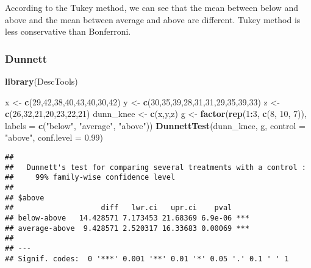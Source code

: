 \documentclass[]{article}
\newenvironment{Shaded}{\begin{snugshade}}{\end{snugshade}}
\newcommand{\KeywordTok}[1]{\textcolor[rgb]{0.13,0.29,0.53}{\textbf{#1}}}
\newcommand{\DataTypeTok}[1]{\textcolor[rgb]{0.13,0.29,0.53}{#1}}
\newcommand{\DecValTok}[1]{\textcolor[rgb]{0.00,0.00,0.81}{#1}}
\newcommand{\FloatTok}[1]{\textcolor[rgb]{0.00,0.00,0.81}{#1}}
\newcommand{\StringTok}[1]{\textcolor[rgb]{0.31,0.60,0.02}{#1}}
\newcommand{\OperatorTok}[1]{\textcolor[rgb]{0.81,0.36,0.00}{\textbf{#1}}}
\newcommand{\NormalTok}[1]{#1}
\begin{document}
According to the Tukey method, we can see that the mean between below
and above and the mean between average and above are different. Tukey
method is less conservative than Bonferroni.

\subsubsection{Dunnett}\label{dunnett}

\begin{Shaded}
\begin{Highlighting}[]
\KeywordTok{library}\NormalTok{(DescTools)}
\end{Highlighting}
\end{Shaded}

\begin{Shaded}
\begin{Highlighting}[]
\NormalTok{x <-}\StringTok{ }\KeywordTok{c}\NormalTok{(}\DecValTok{29}\NormalTok{,}\DecValTok{42}\NormalTok{,}\DecValTok{38}\NormalTok{,}\DecValTok{40}\NormalTok{,}\DecValTok{43}\NormalTok{,}\DecValTok{40}\NormalTok{,}\DecValTok{30}\NormalTok{,}\DecValTok{42}\NormalTok{)}
\NormalTok{y <-}\StringTok{ }\KeywordTok{c}\NormalTok{(}\DecValTok{30}\NormalTok{,}\DecValTok{35}\NormalTok{,}\DecValTok{39}\NormalTok{,}\DecValTok{28}\NormalTok{,}\DecValTok{31}\NormalTok{,}\DecValTok{31}\NormalTok{,}\DecValTok{29}\NormalTok{,}\DecValTok{35}\NormalTok{,}\DecValTok{39}\NormalTok{,}\DecValTok{33}\NormalTok{)}
\NormalTok{z <-}\StringTok{ }\KeywordTok{c}\NormalTok{(}\DecValTok{26}\NormalTok{,}\DecValTok{32}\NormalTok{,}\DecValTok{21}\NormalTok{,}\DecValTok{20}\NormalTok{,}\DecValTok{23}\NormalTok{,}\DecValTok{22}\NormalTok{,}\DecValTok{21}\NormalTok{)}
\NormalTok{dunn_knee <-}\StringTok{ }\KeywordTok{c}\NormalTok{(x,y,z)}
\NormalTok{g <-}\StringTok{ }\KeywordTok{factor}\NormalTok{(}\KeywordTok{rep}\NormalTok{(}\DecValTok{1}\OperatorTok{:}\DecValTok{3}\NormalTok{, }\KeywordTok{c}\NormalTok{(}\DecValTok{8}\NormalTok{, }\DecValTok{10}\NormalTok{, }\DecValTok{7}\NormalTok{)),}
            \DataTypeTok{labels =} \KeywordTok{c}\NormalTok{(}\StringTok{"below"}\NormalTok{,}
                       \StringTok{"average"}\NormalTok{,}
                       \StringTok{"above"}\NormalTok{))}
\KeywordTok{DunnettTest}\NormalTok{(dunn_knee, g, }\DataTypeTok{control =} \StringTok{"above"}\NormalTok{, }\DataTypeTok{conf.level =} \FloatTok{0.99}\NormalTok{)}
\end{Highlighting}
\end{Shaded}

\begin{verbatim}
## 
##   Dunnett's test for comparing several treatments with a control :  
##     99% family-wise confidence level
## 
## $above
##                    diff   lwr.ci   upr.ci    pval    
## below-above   14.428571 7.173453 21.68369 6.9e-06 ***
## average-above  9.428571 2.520317 16.33683 0.00069 ***
## 
## ---
## Signif. codes:  0 '***' 0.001 '**' 0.01 '*' 0.05 '.' 0.1 ' ' 1
\end{verbatim}
\end{document}
